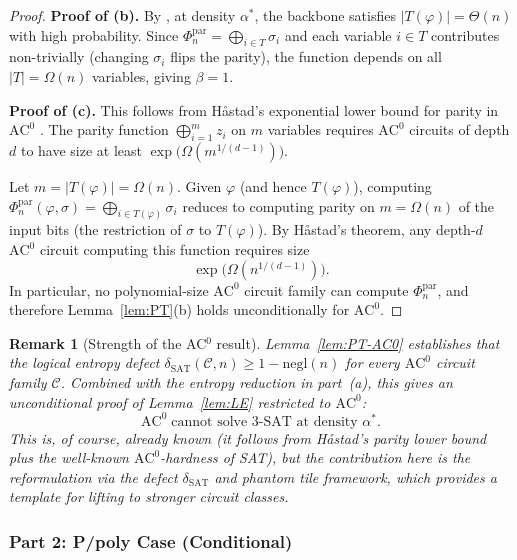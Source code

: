 \documentclass[11pt]{article}
\newtheorem{remark}[lemma]{Remark}
\theoremstyle{definition}
\begin{document}
\begin{proof}
\medskip
\noindent\textbf{Proof of (b).}
By \cite{ART}, at density $\alpha^*$, the backbone satisfies $|T(\varphi)| = \Theta(n)$
with high probability.  Since $\Phi_n^{\mathrm{par}} = \bigoplus_{i \in T} \sigma_i$
and each variable $i \in T$ contributes non-trivially (changing $\sigma_i$ flips the parity),
the function depends on all $|T| = \Omega(n)$ variables, giving $\beta = 1$.

\medskip
\noindent\textbf{Proof of (c).}
This follows from H\aa{}stad's exponential lower bound for parity in $\mathrm{AC}^0$
\cite{Hastad}.  The parity function $\bigoplus_{i=1}^{m} z_i$ on $m$ variables
requires $\mathrm{AC}^0$ circuits of depth $d$ to have size at least
$\exp\!\bigl(\Omega(m^{1/(d-1)})\bigr)$.

Let $m = |T(\varphi)| = \Omega(n)$.  Given $\varphi$ (and hence $T(\varphi)$), computing
$\Phi_n^{\mathrm{par}}(\varphi, \sigma) = \bigoplus_{i \in T(\varphi)} \sigma_i$ reduces
to computing parity on $m = \Omega(n)$ of the input bits (the restriction of $\sigma$
to $T(\varphi)$).  By H\aa{}stad's theorem, any depth-$d$ $\mathrm{AC}^0$ circuit
computing this function requires size
\[
  \exp\!\bigl(\Omega(n^{1/(d-1)})\bigr).
\]
In particular, no polynomial-size $\mathrm{AC}^0$ circuit family can compute
$\Phi_n^{\mathrm{par}}$, and therefore Lemma~\ref{lem:PT}(b) holds unconditionally
for $\mathrm{AC}^0$.
\end{proof}

\begin{remark}[Strength of the AC$^0$ result]
\label{rem:AC0-strength}
Lemma~\ref{lem:PT-AC0} establishes that the logical entropy defect
$\delta_{\mathrm{SAT}}(\mathcal{C}, n) \geq 1 - \mathrm{negl}(n)$ for every
$\mathrm{AC}^0$ circuit family $\mathcal{C}$.  Combined with the entropy reduction
in part~(a), this gives an unconditional proof of Lemma~\ref{lem:LE} restricted to
$\mathrm{AC}^0$:
\[
  \mathrm{AC}^0 \;\text{cannot solve 3-SAT at density } \alpha^*.
\]
This is, of course, already known (it follows from H\aa{}stad's parity lower bound
plus the well-known $\mathrm{AC}^0$-hardness of SAT), but the contribution here is
the reformulation via the defect $\delta_{\mathrm{SAT}}$ and phantom tile framework,
which provides a template for lifting to stronger circuit classes.
\end{remark}

\subsubsection*{Part 2: P/poly Case (Conditional)}
\end{document}
